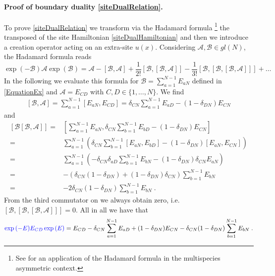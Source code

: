 \documentclass[10pt]{article}
\numberwithin{equation}{section}
\numberwithin{equation}{subsection}
\newcommand{\dt}{\;.}
\newcommand{\fra}[1]{\textcolor[rgb]{0,0,1}{#1}}
\begin{document}
 \paragraph{Proof of boundary duality \eqref{siteDualRelation}.} To prove \eqref{siteDualRelation} we transform via the Hadamard formula \footnote{\fra{See \cite{khuan} for an application of the Hadamard formula in the multispecies asymmetric context.}} the transposed of the site Hamiltonian \eqref{siteDualHamiltonian} and then we  introduce a creation operator acting on an extra-site $u(x)$.
 Considering {$\mathcal{A},\mathcal{B}\in {gl}(N)$}, the Hadamard formula reads 
 \begin{equation}\label{HadamardFormula}
     \exp{(-\mathcal{B})}\mathcal{A}\exp{(\mathcal{B})}=\mathcal{A}-\left[\mathcal{B},\mathcal{A}\right]+\frac{1}{2!}\left[\mathcal{B},\left[\mathcal{B},\mathcal{A}\right]\right]-\frac{1}{3!}\left[\mathcal{B},\left[\mathcal{B},\left[\mathcal{B},\mathcal{A}\right]\right]\right]+\ldots
 \end{equation}
In the following we evaluate this formula for $\mathcal{B}=\sum_{a=1}^{N-1}E_{aN}$ defined in \eqref{EquationEx} and $\mathcal{A}=E_{CD}$  with $C,D\in\{1,\ldots,N\}$. We find  
\begin{align}
	\left[\mathcal{B},\mathcal{A}\right]=\sum_{a=1}^{N-1}\left[E_{aN},E_{CD}\right]=\delta_{CN}\sum_{a=1}^{N-1}E_{aD}-(1-\delta_{DN})E_{CN}
\end{align}
and 
\begin{align}
	\left[\mathcal{B}\left[\mathcal{B},\mathcal{A}\right]\right]=&\left[\sum_{a=1}^{N-1}E_{aN},\delta_{CN}\sum_{b=1}^{N-1}E_{bD}-(1-\delta_{DN})E_{CN}\right]\nonumber\\=&
	\sum_{a=1}^{N-1}\left(\delta_{CN}\sum_{b=1}^{N-1}\left[E_{aN},E_{bD}\right]-(1-\delta_{DN})\left[E_{aN},E_{CN}\right]\right)\nonumber\\=&
	\sum_{a=1}^{N-1}\left(-\delta_{CN}\delta_{aD}\sum_{b=1}^{N-1}E_{bN}-(1-\delta_{DN})\delta_{CN}E_{aN}\right)\nonumber\\=&
	-\left(\delta_{CN}(1-\delta_{DN})+(1-\delta_{DN})\delta_{CN}\right)\sum_{b=1}^{N-1}E_{bN}\nonumber
	\\=&
	-2\delta_{CN}(1-\delta_{DN})\sum_{b=1}^{N-1}E_{bN}\dt
\end{align}
From the third commutator on we always obtain zero, i.e. $[\mathcal{B},[\mathcal{B},[\mathcal{B},\mathcal{A}]]]=0$. All in all we have that 
 \begin{align}\label{HT-BA}
 	\fra{\exp{\left(%
 			-E\right)}E_{CD}\exp{\left(
 		E%
 		\right)}}=E_{CD}-\delta_{CN}\sum_{a=1}^{N-1}E_{aD}+(1-\delta_{DN})E_{CN}-\delta_{CN}(1-\delta_{DN})\sum_{b=1}^{N-1}E_{bN}\dt
 \end{align}
\end{document}
